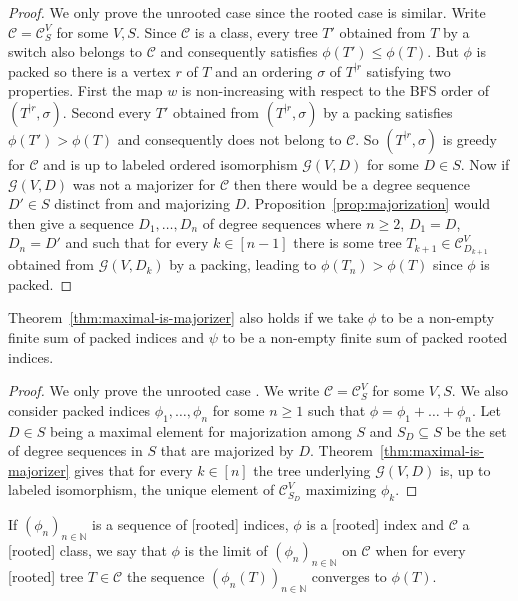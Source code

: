 \documentclass[11 pt]{modarticle}
\newcommand{\cN}{\mathbb{N}}
\newcommand{\wmap}{w}
\newcommand{\rtree}[2]{{#1}^{\lvert #2}}
\newcommand{\ortree}[3]{(\rtree{#1}{#2},{#3})}
\newcommand{\tclass}{\mathcal{C}}
\newcommand{\smallpclass}[2]{\tclass^{#1}_{#2}}
\newcommand{\greedy}[2]{\mathcal{G}(#1,#2)}
\newcommand{\pclass}[2]{\tclass^{#1}_{#2}}
\begin{document}
\begin{proof}
We only prove the unrooted case since the rooted case is similar. Write $\tclass = \pclass{V}{S}$ for some $V,S$. Since $\tclass$ is a class, every tree $T'$ obtained from $T$ by a switch also belongs to $\tclass$ and consequently satisfies $\phi(T') \leq \phi(T)$. But $\phi$ is packed so there is a vertex $r$ of $T$ and an ordering $\sigma$ of $\rtree{T}{r}$ satisfying two properties. First the map $\wmap$ is non-increasing with respect to the BFS order of $\ortree{T}{r}{\sigma}$. Second every $T'$ obtained from $\ortree{T}{r}{\sigma}$ by a packing satisfies $\phi(T') > \phi(T)$ and consequently does not belong to $\tclass$. So $\ortree{T}{r}{\sigma}$ is greedy for $\tclass$ and is up to labeled ordered isomorphism $\greedy{V}{D}$ for some $D \in S$. Now if $\greedy{V}{D}$ was not a majorizer for $\tclass$ then there would be a degree sequence $D' \in S$ distinct from and majorizing $D$. Proposition~\ref{prop:majorization} would then give a sequence $D_1, \dots, D_n$ of degree sequences where $n \geq 2$, $D_1 = D$, $D_n = D'$ and such that for every $k \in [n-1]$ there is some tree $T_{k+1} \in \pclass{V}{D_{k+1}}$ obtained from $\greedy{V}{D_k}$ by a packing, leading to $\phi(T_n) > \phi(T)$ since $\phi$ is packed.
\end{proof}


\begin{cor}\label{cor:maximal-finite-sum}
Theorem~\ref{thm:maximal-is-majorizer} also holds if we take $\phi$ to be a non-empty finite sum of packed indices and $\psi$ to be a non-empty finite sum of packed rooted indices.
\end{cor}

\begin{proof}
We only prove the unrooted case .  We write $\tclass = \pclass{V}{S}$ for some $V,S$. We also consider packed indices $\phi_1, \dots, \phi_n$ for some $n \geq 1$ such that $\phi = \phi_1 + \dots + \phi_n$. Let $D \in S$ being a maximal element for majorization among $S$ and $S_D \subseteq S$ be the set of degree sequences in $S$ that are majorized by $D$. Theorem~\ref{thm:maximal-is-majorizer} gives that for every $k \in [n]$ the tree underlying $\greedy{V}{D}$ is, up to labeled isomorphism, the unique element of $\smallpclass{V}{S_D}$ maximizing $\phi_k$.
\end{proof}

If $(\phi_n)_{n \in \cN}$ is a sequence of [rooted] indices, $\phi$ is a [rooted] index and $\tclass$ a [rooted] class, we say that $\phi$ is the limit of $(\phi_n)_{n \in \cN}$ on $\tclass$ when for every [rooted] tree $T \in \tclass$ the sequence $(\phi_n(T))_{n \in \cN}$ converges to $\phi(T)$.
\end{document}
